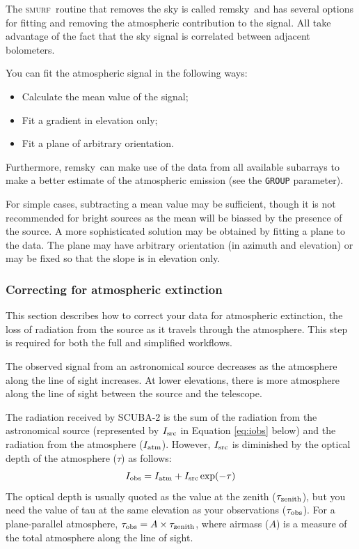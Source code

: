 \documentclass[twoside,11pt]{article}
\newcommand{\xref}[3]{#1}
\newcommand{\xlabel}[1]{}
\renewcommand{\_}{\texttt{\symbol{95}}}
\newcommand{\SMURF}{\textsc{smurf}}
\newcommand{\task}[1]{\textsf{#1}}
\newcommand{\remsky}{\xref{\task{remsky}}{sun258}{REMSKY}}
\begin{document}
The \SMURF\ routine that removes the sky is called \remsky\ and has
several options for fitting and removing the atmospheric contribution
to the signal. All take advantage of the fact that the sky signal is
correlated between adjacent bolometers.

You can fit the atmospheric signal in the following ways:
\begin{itemize}
\item Calculate the mean value of the signal;
\item Fit a gradient in elevation only;
\item Fit a plane of arbitrary orientation.
\end{itemize}
Furthermore, \remsky\ can make use of the data from all available
subarrays to make a better estimate of the atmospheric emission (see
the \texttt{GROUP} parameter).

For simple cases, subtracting a mean value may be sufficient, though
it is not recommended for bright sources as the mean will be biassed
by the presence of the source. A more sophisticated solution may be
obtained by fitting a plane to the data. The plane may have arbitrary
orientation (in azimuth and elevation) or may be fixed so that the
slope is in elevation only.

\subsubsection{\xlabel{extinction}Correcting for atmospheric extinction\label{se:extinction}}

This section describes how to correct your data for atmospheric
extinction, the loss of radiation from the source as it travels
through the atmosphere. This step is required for both the full and
simplified workflows.

The observed signal from an astronomical source decreases as the
atmosphere along the line of sight increases. At lower elevations,
there is more atmosphere along the line of sight between the source
and the telescope.

The radiation received by SCUBA-2 is the sum of the radiation from the
astronomical source (represented by $I_{\rm src}$ in Equation
\ref{eq:iobs} below) and the radiation from the atmosphere ($I_{\rm
  atm}$). However, $I_{\rm src}$ is diminished by the optical depth
of the atmosphere ($\tau$) as follows:
\begin{equation}
I_{\rm obs} = I_{\rm atm} + I_{\rm src} \exp(-\tau)
\label{eq:iobs}
\end{equation}
The optical depth is usually quoted as the value at the zenith
($\tau_{\rm zenith}$), but you need the value of tau at the same
elevation as your observations ($\tau_{\rm obs}$). For a
plane-parallel atmosphere, $\tau_{\rm obs} = A \times \tau_{\rm
  zenith}$, where airmass ($A$) is a measure of the total atmosphere
along the line of sight.
\end{document}
